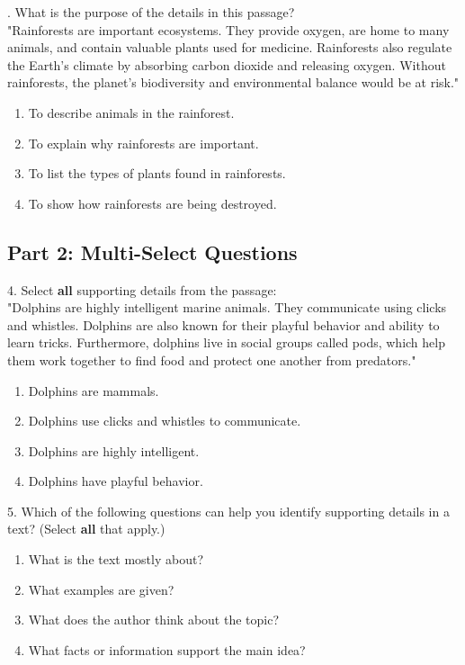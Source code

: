 \documentclass[12pt]{article}
\begin{document}
\vspace{1cm}

. What is the purpose of the details in this passage?\\
"Rainforests are important ecosystems. They provide oxygen, are home to many animals, and contain valuable plants used for medicine. Rainforests also regulate the Earth’s climate by absorbing carbon dioxide and releasing oxygen. Without rainforests, the planet’s biodiversity and environmental balance would be at risk."\\
\begin{enumerate}[label=\Alph*.]
    \item To describe animals in the rainforest.
    \item To explain why rainforests are important.
    \item To list the types of plants found in rainforests.
    \item To show how rainforests are being destroyed.
\end{enumerate}

\vspace{1cm}


\subsection*{Part 2: Multi-Select Questions}

4. Select \textbf{all} supporting details from the passage:  \\
"Dolphins are highly intelligent marine animals. They communicate using clicks and whistles. Dolphins are also known for their playful behavior and ability to learn tricks. Furthermore, dolphins live in social groups called pods, which help them work together to find food and protect one another from predators."\\
\begin{enumerate}[label=\Alph*.]
    \item Dolphins are mammals.
    \item Dolphins use clicks and whistles to communicate.
    \item Dolphins are highly intelligent.
    \item Dolphins have playful behavior.
\end{enumerate}

\vspace{1cm}

5. Which of the following questions can help you identify supporting details in a text? (Select \textbf{all} that apply.)  
\begin{enumerate}[label=\Alph*.]
    \item What is the text mostly about?  
    \item What examples are given?  
    \item What does the author think about the topic?  
    \item What facts or information support the main idea?  
\end{enumerate}
\end{document}
